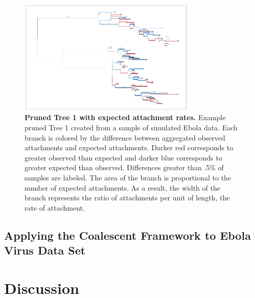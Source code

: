 \documentclass[11pt,oneside,letterpaper]{article}
\begin{document}
\begin{figure}[h]
 \centering
	\includegraphics[width=0.75\textwidth]{figures/rate-diff}
	\caption{\textbf{Pruned Tree 1 with expected attachment rates.}
	Example pruned Tree 1 created from a sample of simulated Ebola data. Each branch is colored by the difference between aggregated observed attachments and expected attachments. Darker red corresponds to greater observed than expected and darker blue corresponds to greater expected than observed. Differences greater than .5\% of samples are labeled. The area of the branch is proportional to the number of expected attachments. As a result, the width of the branch represents the ratio of attachments per unit of length, the rate of attachment.
	}
	\label{F-rates}
\end{figure}





\subsection*{Applying the Coalescent Framework to Ebola Virus Data Set}



\section*{Discussion}
\end{document}
